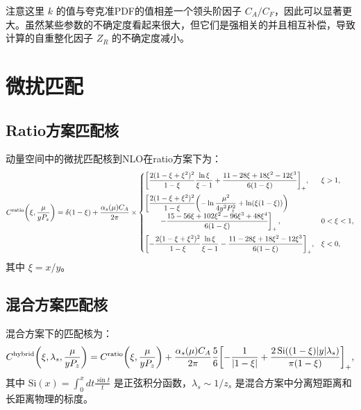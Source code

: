 \documentclass[11pt,a4paper]{article}
\newcommand{\Pz}{P_z}
\newcommand{\alphas}{\alpha_s}
\newcommand{\CA}{C_A}
\newcommand{\CF}{C_F}
\begin{document}
注意这里 $k$ 的值与夸克准PDF的值相差一个领头阶因子 $\CA/\CF$，因此可以显著更大。虽然某些参数的不确定度看起来很大，但它们是强相关的并且相互补偿，导致计算的自重整化因子 $Z_R$ 的不确定度减小。

\section{微扰匹配}

\subsection{Ratio方案匹配核}

动量空间中的微扰匹配核到NLO在ratio方案下为\cite{Balitsky:2021mfb,Yao:2022skw}：
\begin{equation}\label{eq:Cratio}
    C^{\text{ratio}}\qty(\xi, \frac{\mu}{y\Pz}) = \delta(1-\xi) + \frac{\alphas(\mu) \CA}{2\pi} \times
    \begin{cases}
        \displaystyle \qty[\frac{2(1-\xi+\xi^2)^2}{1-\xi} \frac{\ln\xi}{\xi-1} + \frac{11-28\xi+18\xi^2-12\xi^3}{6(1-\xi)}]_+, & \xi > 1,\\[12pt]
        \displaystyle \left[\frac{2(1-\xi+\xi^2)^2}{1-\xi} \qty(-\ln\frac{\mu^2}{4y^2\Pz^2} + \ln(\xi(1-\xi))) \right. \\
        \displaystyle \qquad \left. - \frac{15-56\xi+102\xi^2-96\xi^3+48\xi^4}{6(1-\xi)}\right]_+, & 0 < \xi < 1,\\[12pt]
        \displaystyle \qty[-\frac{2(1-\xi+\xi^2)^2}{1-\xi} \frac{\ln\xi}{\xi-1} - \frac{11-28\xi+18\xi^2-12\xi^3}{6(1-\xi)}]_+, & \xi < 0,
    \end{cases}
\end{equation}
其中 $\xi = x/y$。

\subsection{混合方案匹配核}

混合方案下的匹配核为：
\begin{equation}\label{eq:Chybrid}
    C^{\text{hybrid}}\qty(\xi, \lambda_s, \frac{\mu}{y\Pz}) = C^{\text{ratio}}\qty(\xi, \frac{\mu}{y\Pz}) + \frac{\alphas(\mu) \CA}{2\pi} \frac{5}{6} \qty[-\frac{1}{|1-\xi|} + \frac{2\,\text{Si}((1-\xi)|y|\lambda_s)}{\pi(1-\xi)}]_+,
\end{equation}
其中 $\text{Si}(x) = \int_0^x dt \frac{\sin t}{t}$ 是正弦积分函数，$\lambda_s \sim 1/z_s$ 是混合方案中分离短距离和长距离物理的标度。
\end{document}
